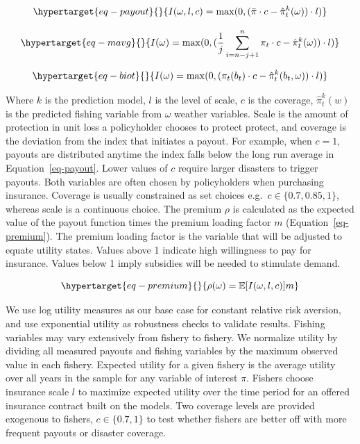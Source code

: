 \documentclass[
  letterpaper,
  DIV=11,
  numbers=noendperiod]{scrartcl}
\begin{document}
\begin{equation}\protect\hypertarget{eq-payout}{}{
I(\omega,l,c)=\max(0,(\bar{\pi}\cdot c-\hat\pi_t^k(\omega)) \cdot l)
}\label{eq-payout}\end{equation}

\begin{equation}\protect\hypertarget{eq-mavg}{}{
I(\omega)=\max(0,(\frac{1}{j}\sum^n_{i=n-j+1}\pi_t\cdot c-\hat{\pi}_t^k(\omega))\cdot l)
}\label{eq-mavg}\end{equation}

\begin{equation}\protect\hypertarget{eq-biot}{}{
I(\omega)=\max(0,(\pi_t(b_t)\cdot c-\hat{\pi}_t^k(b_t,\omega))\cdot l)
}\label{eq-biot}\end{equation}

Where \(k\) is the prediction model, \(l\) is the level of scale, \(c\)
is the coverage, \(\hat\pi_t^k(w)\) is the predicted fishing variable
from \(\omega\) weather variables. Scale is the amount of protection in
unit loss a policyholder chooses to protect protect, and coverage is the
deviation from the index that initiates a payout. For example, when
\(c=1\), payouts are distributed anytime the index falls below the long
run average in Equation~\ref{eq-payout}. Lower values of \(c\) require
larger disasters to trigger payouts. Both variables are often chosen by
policyholders when purchasing insurance. Coverage is usually constrained
as set choices e.g.~\(c\in\{0.7,0.85,1\}\), whereas scale is a
continuous choice. The premium \(\rho\) is calculated as the expected
value of the payout function times the premium loading factor \(m\)
(Equation~\ref{eq-premium}). The premium loading factor is the variable
that will be adjusted to equate utility states. Values above 1 indicate
high willingness to pay for insurance. Values below 1 imply subsidies
will be needed to stimulate demand.

\begin{equation}\protect\hypertarget{eq-premium}{}{
\rho(\omega)=\mathbb{E}[I(\omega,l,c)]m
}\label{eq-premium}\end{equation}

We use log utility measures as our base case for constant relative risk
aversion, and use exponential utility as robustness checks to validate
results. Fishing variables may vary extensively from fishery to fishery.
We normalize utility by dividing all measured payouts and fishing
variables by the maximum observed value in each fishery. Expected
utility for a given fishery is the average utility over all years in the
sample for any variable of interest \(\pi\). Fishers choose insurance
scale \(l\) to maximize expected utility over the time period for an
offered insurance contract built on the models. Two coverage levels are
provided exogenous to fishers, \(c\in\{0.7,1\}\) to test whether fishers
are better off with more frequent payouts or disaster coverage.
\end{document}

